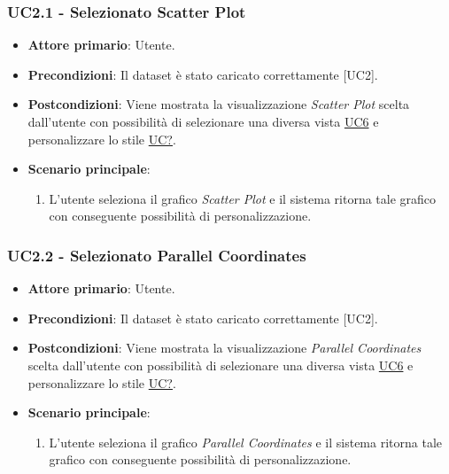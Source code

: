 \subsubsection{UC2.1 - Selezionato Scatter Plot}
\label{sec:UC2.1}
\begin{itemize}
    \item \textbf{Attore primario}: Utente.
    \item \textbf{Precondizioni}: Il dataset è stato caricato correttamente [UC2].
    \item \textbf{Postcondizioni}: Viene mostrata la visualizzazione \textit{Scatter Plot} scelta dall'utente con possibilità di selezionare una diversa vista \hyperref[sec:UC6]{UC6} e personalizzare lo stile \hyperref[sec:UC2]{UC?}. %
    \item \textbf{Scenario principale}:
          \begin{enumerate}
              \item L'utente seleziona il grafico \textit{Scatter Plot} e il sistema ritorna tale grafico con conseguente possibilità di personalizzazione. 
          \end{enumerate}
\end{itemize}

\subsubsection{UC2.2 - Selezionato Parallel Coordinates}
\label{sec:UC2.2}
\begin{itemize}
    \item \textbf{Attore primario}: Utente.
    \item \textbf{Precondizioni}: Il dataset è stato caricato correttamente [UC2].
    \item \textbf{Postcondizioni}: Viene mostrata la visualizzazione \textit{Parallel Coordinates} scelta dall'utente con possibilità di selezionare una diversa vista \hyperref[sec:UC6]{UC6} e personalizzare lo stile \hyperref[sec:UC2]{UC?}. %
    \item \textbf{Scenario principale}:
          \begin{enumerate}
              \item L'utente seleziona il grafico \textit{Parallel Coordinates} e il sistema ritorna tale grafico con conseguente possibilità di personalizzazione. 
          \end{enumerate}
\end{itemize}

